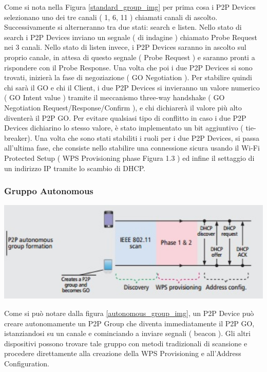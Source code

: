 Come si nota nella Figura \ref{standard_group_img} per prima cosa i P2P Devices selezionano uno dei tre canali ( 1, 6, 11 ) chiamati canali di ascolto.
Successivamente si alterneranno tra due stati: search e listen.
Nello stato di search i P2P Devices inviano un segnale ( di indagine ) chiamato Probe Request nei 3 canali.
Nello stato di listen invece, i P2P Devices saranno in ascolto sul proprio canale, in attesa di questo segnale ( Probe Request ) e saranno pronti a rispondere con il Probe Response.
Una volta che poi i due P2P Devices si sono trovati, inizierà la fase di negoziazione ( GO Negotiation ).
Per stabilire quindi chi sarà il GO e chi il Client, i due P2P Devices si invieranno un valore numerico ( GO Intent value ) tramite il meccanismo three-way handshake (  GO Negotiation Request/Response/Confirm ), e chi dichiarerà il valore più alto diventerà il P2P GO.
Per evitare qualsiasi tipo di conflitto in caso i due P2P Devices dichiarino lo stesso valore, è stato implementato un bit aggiuntivo ( tie-breaker).
Una volta che sono stati stabiliti i ruoli per i due P2P Devices, si passa all’ultima fase, che consiste nello stabilire una connessione sicura usando il Wi-Fi Protected Setup ( WPS Provisioning phase Figura 1.3 ) ed infine il settaggio di un indirizzo IP tramite lo scambio di DHCP.

\subsubsection{Gruppo Autonomous}

\begin{center}
\includegraphics[width=1\textwidth]{imgs/Autonomous_Group.jpg}
\label{autonomous_group_img}%
\end{center}

Come si può notare dalla figura \ref{autonomous_group_img}, un P2P Device può creare autonomamente un P2P Group che diventa immediatamente il P2P GO, istanziandosi su un canale e cominciando a inviare segnali ( beacon ).
Gli altri dispositivi possono trovare tale gruppo con metodi tradizionali di scansione e procedere direttamente alla creazione della WPS Provisioning e all’Address Configuration.

